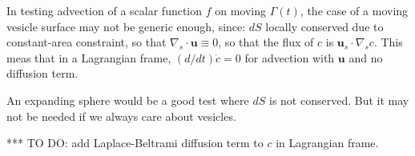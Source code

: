 \documentclass[11pt]{article}
\newcommand{\mbf}[1]{{\mathbf #1}}
\newcommand{\uu}{\mbf{u}}
\begin{document}
In testing advection of a scalar function $f$ on moving
$\Gamma(t)$, the case of a moving vesicle surface
may not be generic enough,
since: $dS$ locally conserved due to constant-area constraint,
so that $\nabla_s \cdot \uu \equiv 0$, so that the flux of $c$
is $\uu_s \cdot \nabla_s c$.
This meas that in a Lagrangian frame,
$(d/dt) \dot c  = 0$ for advection with $\uu$ and no diffusion term.

An expanding sphere would  be a good test where $dS$ is not conserved.
But it may not be needed if we always care about vesicles.

*** TO DO: add Laplace-Beltrami diffusion term to $c$ in Lagrangian frame.



%
%
\end{document}
